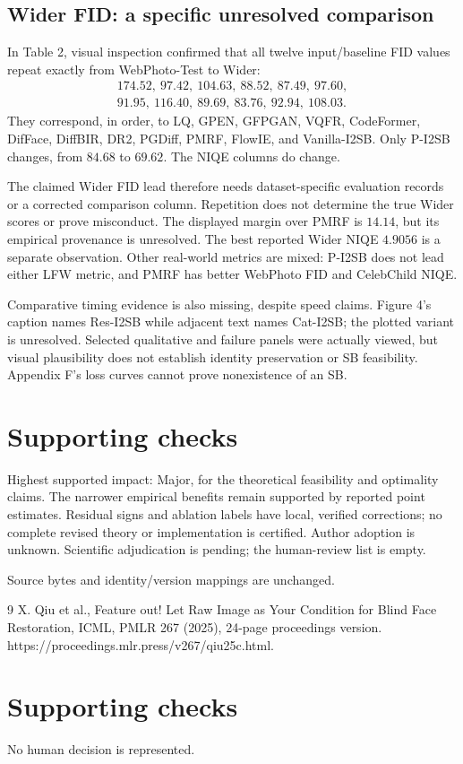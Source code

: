 \documentclass[10pt]{article}
\begin{document}
\subsection*{Wider FID: a specific unresolved comparison}
In Table 2, visual inspection confirmed that all twelve input/baseline FID values repeat exactly from WebPhoto-Test to Wider: \[\begin{gathered}
 174.52,\ 97.42,\ 104.63,\ 88.52,\ 87.49,\ 97.60,\\
 91.95,\ 116.40,\ 89.69,\ 83.76,\ 92.94,\ 108.03.
 \end{gathered}\] They correspond, in order, to LQ, GPEN, GFPGAN, VQFR, CodeFormer, DifFace, DiffBIR, DR2, PGDiff, PMRF, FlowIE, and Vanilla-I2SB. Only P-I2SB changes, from \(84.68\) to \(69.62\). The NIQE columns do change.\par
The claimed Wider FID lead therefore needs dataset-specific evaluation records or a corrected comparison column. Repetition does not determine the true Wider scores or prove misconduct. The displayed margin over PMRF is \(14.14\), but its empirical provenance is unresolved. The best reported Wider NIQE \(4.9056\) is a separate observation. Other real-world metrics are mixed: P-I2SB does not lead either LFW metric, and PMRF has better WebPhoto FID and CelebChild NIQE.\par
Comparative timing evidence is also missing, despite speed claims. Figure 4’s caption names Res-I2SB while adjacent text names Cat-I2SB; the plotted variant is unresolved. Selected qualitative and failure panels were actually viewed, but visual plausibility does not establish identity preservation or SB feasibility. Appendix F’s loss curves cannot prove nonexistence of an SB.\par
\section*{Supporting checks}
Highest supported impact: Major, for the theoretical feasibility and optimality claims. The narrower empirical benefits remain supported by reported point estimates. Residual signs and ablation labels have local, verified corrections; no complete revised theory or implementation is certified. Author adoption is unknown. Scientific adjudication is pending; the human-review list is empty.\par
Source bytes and identity/version mappings are unchanged.\par
9 X. Qiu et al., Feature out! Let Raw Image as Your Condition for Blind Face Restoration, ICML, PMLR 267 (2025), 24-page proceedings version. https://proceedings.mlr.press/v267/qiu25c.html.\par
\section*{Supporting checks}
No human decision is represented.\par
\end{document}
